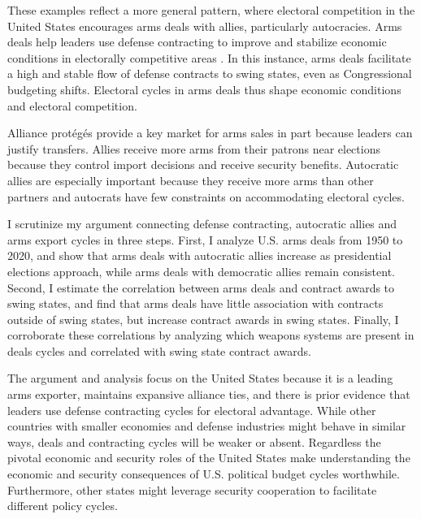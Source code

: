 \documentclass[12pt]{article}
\begin{document}
These examples reflect a more general pattern, where electoral competition in the United States encourages arms deals with allies, particularly autocracies.
Arms deals help leaders use defense contracting to improve and stabilize economic conditions in electorally competitive areas \citep{Tufte1978, Mintz1988, Mayer1995, DerouenHeo2000, Becker2021}. 
In this instance, arms deals facilitate a high and stable flow of defense contracts to swing states, even as Congressional budgeting shifts. 
Electoral cycles in arms deals thus shape economic conditions and electoral competition. 


Alliance prot{\'e}g{\'e}s provide a key market for arms sales in part because leaders can justify transfers. 
Allies receive more arms from their patrons near elections because they control import decisions and receive security benefits. 
Autocratic allies are especially important because they receive more arms than other partners \citep{McManusYarhi-Milo2017} and autocrats have few constraints on accommodating electoral cycles.


I scrutinize my argument connecting defense contracting, autocratic allies and arms export cycles in three steps. 
First, I analyze U.S. arms deals from 1950 to 2020, and show that arms deals with autocratic allies increase as presidential elections approach, while arms deals with democratic allies remain consistent. 
Second, I estimate the correlation between arms deals and contract awards to swing states, and find that arms deals have little association with contracts outside of swing states, but increase contract awards in swing states. 
Finally, I corroborate these correlations by analyzing which weapons systems are present in deals cycles and correlated with swing state contract awards.


The argument and analysis focus on the United States because it is a leading arms exporter, maintains expansive alliance ties, and there is prior evidence that leaders use defense contracting cycles for electoral advantage. 
While other countries with smaller economies and defense industries might behave in similar ways, deals and contracting cycles will be weaker or absent.
Regardless the pivotal economic and security roles of the United States make understanding the economic and security consequences of U.S. political budget cycles worthwhile.
Furthermore, other states might leverage security cooperation to facilitate different policy cycles. 
\end{document}
